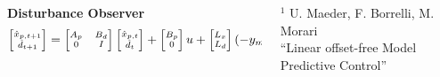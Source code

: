 \documentclass[9pt, aspectratio=169]{beamer}
\begin{document}
\begin{frame}
\begin{columns}
\begin{column}{0.7\textwidth}
\begin{block}{}
\centering
\textcolor{emph@Thesis}{\textbf{Disturbance Observer}} 
\begin{equation*}
\scriptsize
    	\begin{bmatrix}
    	 \hat{x}_{p,t+1} \\
            \hat{d}_{t+1}
        \end{bmatrix}
        = 
    	\begin{bmatrix}
    		A_p & B_d \\
    		0 & I
    	\end{bmatrix}
    	\begin{bmatrix}
    		\hat{x}_{p,t} \\
    		\hat{d}_t
    	\end{bmatrix}
        +
    	\begin{bmatrix}
    		B_p \\
    		0
    	\end{bmatrix}
        u +
        \begin{bmatrix}
            L_x \\
            L_d \\
        \end{bmatrix} 
        ( - y_{m,t} +
        \begin{bmatrix}
            C & C_d 
        \end{bmatrix}
        \begin{bmatrix}
            \hat{x}_{p,t} \\
            \hat{d}_t
        \end{bmatrix} ) 
\end{equation*}
\end{block}
\end{column}

\begin{column}{0.3\textwidth}

\vspace{1cm}

 \color{gray} \scriptsize $^1$ U. Maeder, F. Borrelli, M. Morari \\ 
“Linear offset-free Model Predictive Control”
\end{column}
\end{columns}

\end{frame}
\end{document}
